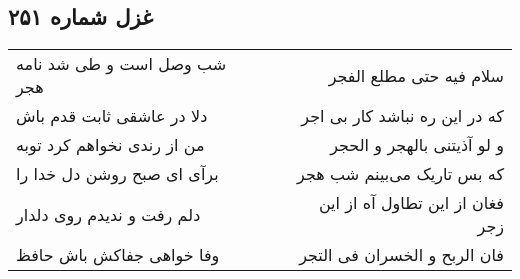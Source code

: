 \begin{center}
\section*{غزل شماره ۲۵۱}
\label{sec:sh251}
\begin{longtable}{l p{0.5cm} r}
شب وصل است و طی شد نامه هجر
&&
سلام فیه حتی مطلع الفجر
\\
دلا در عاشقی ثابت قدم باش
&&
که در این ره نباشد کار بی اجر
\\
من از رندی نخواهم کرد توبه
&&
و لو آذیتنی بالهجر و الحجر
\\
برآی ای صبح روشن دل خدا را
&&
که بس تاریک می‌بینم شب هجر
\\
دلم رفت و ندیدم روی دلدار
&&
فغان از این تطاول آه از این زجر
\\
وفا خواهی جفاکش باش حافظ
&&
فان الربح و الخسران فی التجر
\\
\end{longtable}
\end{center}
